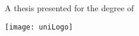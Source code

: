 \begin{titlepage}
    \begin{center}
        \vspace*{1cm}

        \textbf{\thesisTitle}


        \vspace{1.5cm}

        \textbf{\name}

        \vfill

        A thesis presented for the degree of\\
        \degree

        \vspace{0.8cm}

        \texttt{[image: uniLogo]}

        \department\\
        \institution\\
        \country\\
        \submissionDate

    \end{center}
\end{titlepage}

